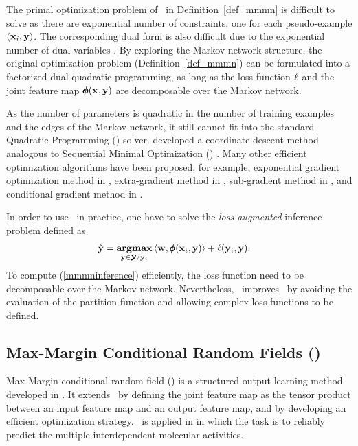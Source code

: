 {The primal optimization problem of \mmmn\ in Definition~\ref{def_mmmn} is difficult to solve as there are exponential number of constraints, one for each pseudo-example $(\mathbf {x}_i,\mathbf {y})$.
The corresponding dual form is also difficult due to the exponential number of dual variables \citep{Taskar04max}.
By exploring the Markov network structure, the original optimization problem (Definition~\ref{def_mmmn}) can be formulated into a factorized dual quadratic programming, as long as the loss function $\mathbf {\ell}$ and the joint feature map $\pmb \phi(\mathbf {x},\mathbf {y})$ are decomposable over the Markov network.

As the number of parameters is quadratic in the number of training examples and the edges of the Markov network, it still cannot fit into the standard Quadratic Programming (\qp) solver. 
\citet{Taskar04max} developed a coordinate descent method analogous to Sequential Minimal Optimization (\smo) \citep{Platt98sequential,Platt99fast}.
Many other efficient optimization algorithms have been proposed, for example, exponential gradient optimization method in \citep{bartlett04}, 
extra-gradient method in \citep{taskar06},
sub-gradient method in \citet{Ratliff07},
and conditional gradient method in \citep{Rousu06, Rousu07}.

In order to use \mmmn\ in practice, one have to solve the \textit{loss augmented} inference problem defined as
\begin{align}
	\hat{\mathbf {y}} = \underset{\mathbf {y}\in\pmb {\mathcal{Y}}/\mathbf {y}_i}{\textbf{argmax}} &\, \langle \mathbf {w}, \pmb \phi(\mathbf {x}_i,\mathbf {y}) \rangle + \mathbf {\ell}(\mathbf {y}_i,\mathbf {y}) \label{mmmninference}.
\end{align} 
To compute (\ref{mmmninference}) efficiently, the loss function need to be decomposable over the Markov network.
Nevertheless, \mmmn\ improves \crf\ by avoiding the evaluation of the partition function and allowing complex loss functions to be defined.



%
%
\subsection{Max-Margin Conditional Random Fields (\mmcrf)} \label{sc_mmcrf}

Max-Margin conditional random field (\mmcrf) is a structured output learning method developed in \citep{Rousu07}.
It extends \mmmn\ by defining the joint feature map as the tensor product between an input feature map and an output feature map, and by developing an efficient optimization strategy. 
\mmcrf\ is applied in  in which the task is to reliably predict the multiple interdependent molecular activities.

}
